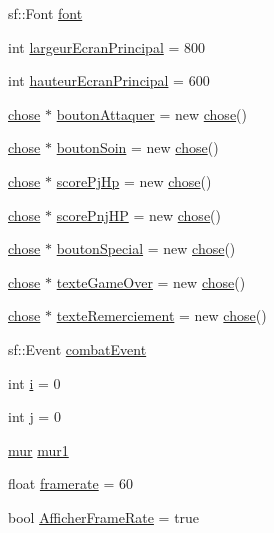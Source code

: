 \begin{DoxyCompactItemize}
\item 
sf\+::\+Font \mbox{\hyperlink{classjeu_a685fe02c4c50c625c50732830a9a09f3}{font}}
\item 
int \mbox{\hyperlink{classjeu_a1fcaf4729384cac7fdeb17bad1d602b0}{largeur\+Ecran\+Principal}} = 800
\item 
int \mbox{\hyperlink{classjeu_aab57f032f42308237e6bf9069f42870e}{hauteur\+Ecran\+Principal}} = 600
\item 
\mbox{\hyperlink{classchose}{chose}} $\ast$ \mbox{\hyperlink{classjeu_ac2abbfb40adca68f9d6ef5b3c34e2deb}{bouton\+Attaquer}} = new \mbox{\hyperlink{classchose}{chose}}()
\item 
\mbox{\hyperlink{classchose}{chose}} $\ast$ \mbox{\hyperlink{classjeu_a6396acebe5d701ce532d0b27fb9468dd}{bouton\+Soin}} = new \mbox{\hyperlink{classchose}{chose}}()
\item 
\mbox{\hyperlink{classchose}{chose}} $\ast$ \mbox{\hyperlink{classjeu_a80f00b1c807ea6817bdb432a069600b7}{score\+Pj\+Hp}} = new \mbox{\hyperlink{classchose}{chose}}()
\item 
\mbox{\hyperlink{classchose}{chose}} $\ast$ \mbox{\hyperlink{classjeu_abc8d0cfa5849ba7e4159fcf5fbe7e91a}{score\+Pnj\+HP}} = new \mbox{\hyperlink{classchose}{chose}}()
\item 
\mbox{\hyperlink{classchose}{chose}} $\ast$ \mbox{\hyperlink{classjeu_a90c1e01c86044871fa86b3c1e1f3c3ea}{bouton\+Special}} = new \mbox{\hyperlink{classchose}{chose}}()
\item 
\mbox{\hyperlink{classchose}{chose}} $\ast$ \mbox{\hyperlink{classjeu_a2fdd2cefbf2b699bb0fb47ccea1cae69}{texte\+Game\+Over}} = new \mbox{\hyperlink{classchose}{chose}}()
\item 
\mbox{\hyperlink{classchose}{chose}} $\ast$ \mbox{\hyperlink{classjeu_a506ea767918d5ac9622a4cadf1b8eaea}{texte\+Remerciement}} = new \mbox{\hyperlink{classchose}{chose}}()
\item 
sf\+::\+Event \mbox{\hyperlink{classjeu_aa3d0d1f40c3f67f92a2bd01da43acc12}{combat\+Event}}
\item 
int \mbox{\hyperlink{classjeu_a6ea074d22112a65a6da5b898cdc87ea2}{i}} = 0
\item 
int \mbox{\hyperlink{classjeu_a91c0fab688b58c38cd214c0d8cd8cc8e}{j}} = 0
\item 
\mbox{\hyperlink{classmur}{mur}} \mbox{\hyperlink{classjeu_aae067b47cfeb93fa11ddf3b7d1c9910d}{mur1}}
\item 
float \mbox{\hyperlink{classjeu_a6a6fdfc55acc0b08ea2c7f9874060f58}{framerate}} = 60
\item 
bool \mbox{\hyperlink{classjeu_a838215cb29965391c0e4c8313a6442da}{Afficher\+Frame\+Rate}} = true
\end{DoxyCompactItemize}


